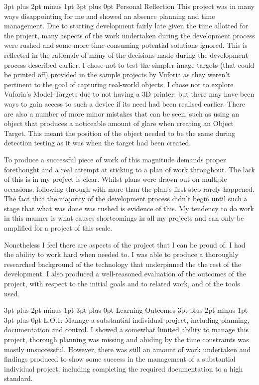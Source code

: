 \documentclass[12pt,a4paper,oneside]{article}
\makeatletter
\renewcommand\paragraph{\@startsection {paragraph}{1}{0mm} %
	                           {3pt plus 2pt minus 1pt} %
	                           {3pt plus 0pt} %
	                           {\normalfont}}
\renewcommand\subsubsection{\@startsection {subsubsection}{1}{0mm} %
	                           {3pt plus 2pt minus 1pt} %
	                           {3pt plus 0pt} %
	                           {\normalfont\bfseries}}
\renewcommand\subsection{\@startsection {subsection}{1}{0mm} %
                               {3pt plus 2pt minus 1pt} %
                               {3pt plus 0pt} %
                               {\large\bfseries}}
\makeatother
\begin{document}
\subsection{Personal Reflection}
This project was in many ways disappointing for me and showed an absence planning and time management. Due to starting development fairly late given the time allotted for the project, many aspects of the work undertaken during the development process were rushed and some more time-consuming potential solutions ignored. This is reflected in the rationale of many of the decisions made during the development process described earlier. I chose not to test the simpler image targets (that could be printed off) provided in the sample projects by Vuforia as they weren't pertinent to the goal of capturing real-world objects. I chose not to explore Vuforia's Model-Targets due to not having a 3D printer, but there may have been ways to gain access to such a device if its need had been realised earlier. There are also a number of more minor mistakes that can be seen, such as using an object that produces a noticeable amount of glare when creating an Object Target. This meant the position of the object needed to be the same during detection testing as it was when the target had been created.

To produce a successful piece of work of this magnitude demands proper forethought and a real attempt at sticking to a plan of work throughout. The lack of this is in my project is clear. Whilst plans were drawn out on multiple occasions, following through with more than the plan's first step rarely happened. The fact that the majority of the development process didn't begin until such a stage that what was done was rushed is evidence of this. My tendency to do work in this manner is what causes shortcomings in all my projects and can  only be amplified for a project of this scale.

Nonetheless I feel there are aspects of the project that I can be proud of. I had the ability to work hard when needed to. I was able to produce a thoroughly researched background of the technology that underpinned the the rest of the development. I also produced a well-reasoned evaluation of the outcomes of the project, with respect to the initial goals and to related work, and of the tools used. 

\subsubsection{Learning Outcomes}
\paragraph{L.O.1: Manage a substantial individual project, including planning, documentation and control.}
I showed a somewhat limited ability to manage this project, thorough planning was missing and abiding by the time constraints was mostly unsuccessful. However, there was still an amount of work undertaken and findings produced to show some success in the management of a substantial individual project, including completing the required documentation to a high standard.
\end{document}
